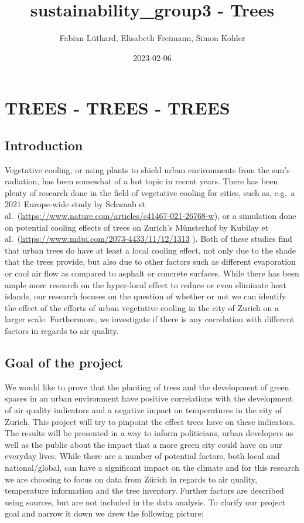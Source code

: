 \documentclass[
]{article}
\title{sustainability\_group3 - Trees}
\author{Fabian Lüthard, Elisabeth Freimann, Simon Kohler}
\date{2023-02-06}
\begin{document}
\maketitle

{
\setcounter{tocdepth}{2}
\tableofcontents
}
\hypertarget{trees---trees---trees}{%
\section{TREES - TREES - TREES}\label{trees---trees---trees}}

\hypertarget{introduction}{%
\subsection{Introduction}\label{introduction}}

Vegetative cooling, or using plants to shield urban environments from
the sun's radiation, has been somewhat of a hot topic in recent years.
There has been plenty of research done in the field of vegetative
cooling for cities, such as, e.g.~a 2021 Europe-wide study by Schwaab et
al.~(\url{https://www.nature.com/articles/s41467-021-26768-w}), or a
simulation done on potential cooling effects of trees on Zurich's
Münsterhof by Kubilay et
al.~(\url{https://www.mdpi.com/2073-4433/11/12/1313} ). Both of these
studies find that urban trees do have at least a local cooling effect,
not only due to the shade that the trees provide, but also due to other
factors such as different evaporation or cool air flow as compared to
asphalt or concrete surfaces. While there has been ample more research
on the hyper-local effect to reduce or even eliminate heat islands, our
research focuses on the question of whether or not we can identify the
effect of the efforts of urban vegetative cooling in the city of Zurich
on a larger scale. Furthermore, we investigate if there is any
correlation with different factors in regards to air quality.

\hypertarget{goal-of-the-project}{%
\subsection{Goal of the project}\label{goal-of-the-project}}

We would like to prove that the planting of trees and the development of
green spaces in an urban environment have positive correlations with the
development of air quality indicators and a negative impact on
temperatures in the city of Zurich. This project will try to pinpoint
the effect trees have on these indicators. The results will be presented
in a way to inform politicians, urban developers as well as the public
about the impact that a more green city could have on our everyday
lives. While there are a number of potential factors, both local and
national/global, can have a significant impact on the climate and for
this research we are choosing to focus on data from Zürich in regards to
air quality, temperature information and the tree inventory. Further
factors are described using sources, but are not included in the data
analysis. To clarify our project goal and narrow it down we drew the
following picture:
\end{document}
